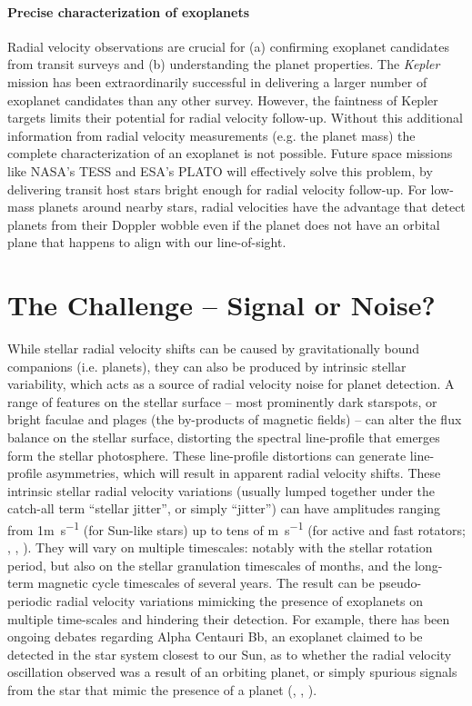 \documentclass[a4paper]{article}
\begin{document}
\paragraph{Precise characterization of exoplanets}
Radial velocity observations are crucial for (a) confirming exoplanet candidates from transit surveys and 
(b) understanding the planet properties. 
The \textit{Kepler} mission has been extraordinarily successful in delivering a larger number of exoplanet candidates than any other survey. However, the faintness of Kepler targets limits their potential for radial velocity follow-up. 
Without this additional information from radial velocity measurements (e.g. the planet mass) the complete 
characterization of an exoplanet is not possible. Future space missions like 
NASA's TESS \cite{Ricker2014} and ESA's PLATO \cite{Rauer2014} will effectively solve this problem, 
by delivering transit host stars bright enough for radial velocity follow-up. 
For low-mass planets around nearby stars,
radial velocities have the advantage that detect planets from their Doppler wobble even if the planet does not have an orbital plane that happens to align with our line-of-sight. 


\section{The Challenge -- Signal or Noise?}
While stellar radial velocity shifts can be caused by gravitationally bound companions (i.e. planets), they can also be produced by intrinsic stellar variability, which acts as a source of radial velocity noise for planet detection. A range of features on the stellar surface -- most prominently dark starspots, or bright faculae and plages (the by-products of magnetic fields) -- can alter the flux balance on the stellar surface, distorting the spectral line-profile that emerges form the stellar photosphere. These line-profile distortions can generate line-profile asymmetries, which will result in apparent radial velocity shifts. These intrinsic stellar radial velocity variations (usually lumped together under the catch-all term ``stellar jitter'', or simply ``jitter'')  can have amplitudes ranging from 1\si{m.s^{-1}} (for Sun-like stars) up to tens of \si{m.s^{-1}} (for active and fast rotators; \cite{Lagrange2011}, \cite{Makarov2009}, \cite{Dumusque2016}). They will vary on multiple timescales: notably with the stellar rotation period, but also on the stellar granulation timescales of months, and the long-term magnetic cycle timescales of several years. The result can be pseudo-periodic radial velocity variations mimicking the presence of exoplanets on multiple time-scales and hindering their detection. For example, there has been ongoing debates regarding Alpha Centauri Bb, an exoplanet claimed to be detected in the star system closest to our Sun, as to whether the radial velocity oscillation observed was a result of an orbiting planet, or simply spurious signals from the star that mimic the presence of a planet (\cite{Dumusque2012Natur}, \cite{Rajpaul2016}, \cite{Hatzes}).
\end{document}
